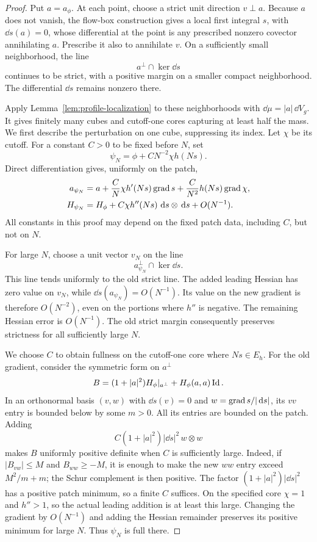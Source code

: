 \begin{proof}
Put $a=a_\phi$.  At each point, choose a strict unit direction $v\perp a$.
Because $a$ does not vanish, the flow-box construction gives a local first
integral $s$, with $\dd s(a)=0$, whose differential at the point is any
prescribed nonzero covector annihilating $a$.  Prescribe it also to
annihilate $v$.  On a sufficiently small neighborhood, the line
\[
 a^\perp\cap\ker\dd s
\]
continues to be strict, with a positive margin on a smaller compact
neighborhood.  The differential $\dd s$ remains nonzero there.

Apply Lemma~\ref{lem:profile-localization} to these neighborhoods with
$\dd\mu=|a|\,\dd V_g$.  It gives finitely many cubes and cutoff-one cores
capturing at least half the mass.  We first describe the perturbation on
one cube, suppressing its index.  Let $\chi$ be its cutoff.  For a constant
$C>0$ to be fixed before $N$, set
\[
 \psi_N=\phi+C N^{-2}\chi h(Ns).
\]
Direct differentiation gives, uniformly on the patch,
\begin{align*}
 a_{\psi_N}
 &=a+\frac C N\chi h'(Ns)\operatorname{grad} s
       +\frac C{N^2}h(Ns)\operatorname{grad}\chi,\\
 H_{\psi_N}
 &=H_\phi+C\chi h''(Ns)\,\,\mathrm d s\otimes\,\mathrm d s+O(N^{-1}).
\end{align*}
All constants in this proof may depend on the fixed patch data, including
$C$, but not on $N$.

For large $N$, choose a unit vector $v_N$ on the line
\[
 a_{\psi_N}^{\perp}\cap\ker\dd s.
\]
This line tends uniformly to the old strict line.  The added leading
Hessian has zero value on $v_N$, while
$\dd s(a_{\psi_N})=O(N^{-1})$.  Its value on the new gradient is
therefore $O(N^{-2})$, even on the portions where $h''$ is negative.  The
remaining Hessian error is $O(N^{-1})$.  The old strict margin consequently
preserves strictness for all sufficiently large $N$.

We choose $C$ to obtain fullness on the cutoff-one core where $Ns\in E_h$.
For the old gradient, consider the symmetric form on $a^\perp$
\[
 B=(1+|a|^2)H_\phi|_{a^\perp}+H_\phi(a,a)\operatorname{Id}.
\]
In an orthonormal basis $(v,w)$ with $\dd s(v)=0$ and
$w=\operatorname{grad} s/|\,\mathrm d s|$, its $vv$ entry is bounded below by some $m>0$.
All its entries are bounded on the patch.  Adding
\[
 C(1+|a|^2)|\dd s|^2\,w\otimes w
\]
makes $B$ uniformly positive definite when $C$ is sufficiently large.
Indeed, if $|B_{vw}|\le M$ and $B_{ww}\ge-M$, it is enough to make the
new $ww$ entry exceed $M^2/m+m$; the Schur complement is then positive.
The factor $(1+|a|^2)|\dd s|^2$ has a positive patch minimum, so a finite
$C$ suffices.  On the specified core $\chi=1$ and $h''>1$, so the actual
leading addition is at least this large.  Changing the gradient by
$O(N^{-1})$ and adding the Hessian remainder preserves its positive
minimum for large $N$.  Thus $\psi_N$ is full there.


\end{proof}
